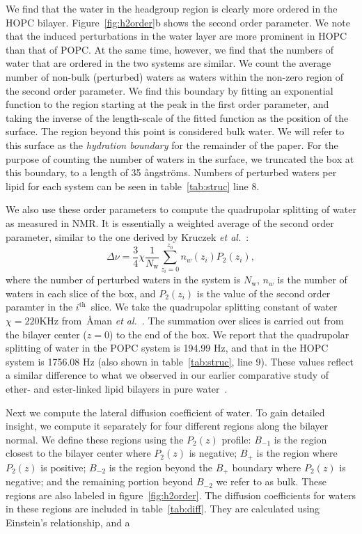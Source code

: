 \documentclass[12pt,preprint,times,openany,draft]{book}
\newcommand{\etal}{\textit{et al.}}
\newcommand{\aangstroms}{{\aa}ngstr{\"o}ms}
\begin{document}
We find that the water in the headgroup region is clearly more ordered in the HOPC bilayer.  
Figure~\ref{fig:h2order}b shows the second order parameter. We note that the induced perturbations in the water layer are more prominent in HOPC than that of POPC.
At the same time, however, we find that the numbers of water that are ordered in the two systems are similar.
We count the average number of non-bulk (perturbed) waters as waters within the non-zero region of the second order parameter. 
We find this boundary by fitting an exponential function to the region starting at the peak in
the first order parameter, and taking the inverse of the length-scale of the fitted function as the position of the surface.
The region beyond this point is considered bulk water. We will refer to this surface as the \emph{hydration boundary} for the remainder of the paper.
For the purpose of counting the number of waters in the surface, we truncated the box at this boundary, to a length of 35 \aangstroms. 
Numbers of perturbed waters per lipid for each system can be seen in table~\ref{tab:struc} line 8.

We also use these order parameters to compute the quadrupolar splitting of water as measured in NMR. 
It is essentially a weighted average of the second order parameter, similar to the one derived by Kruczek \etal~\cite{kruczek:2017:ether}: %
\begin{equation}
\label{eq:deltanu}
\Delta \nu = \frac{3}{4} \chi \frac{1}{N_{\text{w}}}\sum^{z_0}_{z_i=0}n_{w}(z_i)P_2(z_i),
\end{equation}
where the number of perturbed waters in the system is $N_\text{w}$, $n_{w}$ is the number of waters in each slice of the box,
and $P_2(z_i)$ is the value of the second order paramter in the $i^{\text{th}}$~slice. We take the quadrupolar splitting constant of water $\chi=220 \text{KHz}$ 
from~{\AA}man \etal~\cite{aaman:2003}. 
The summation over slices is carried out from the bilayer center ($z=0$) to 
the end of the box. 
We report that the quadrupolar splitting of water in the POPC system is 194.99 Hz, and that in the HOPC system is 1756.08 Hz (also shown in table~\ref{tab:struc}, line 9). 
These values reflect a similar difference to what we observed in our earlier comparative study of ether- and ester-linked lipid bilayers in pure water~\cite{kruczek:2017:ether}.

Next we compute the lateral diffusion coefficient of water. To gain detailed insight, we compute it 
separately for four different regions along the bilayer normal. We define these regions 
using the $P_2(z)$ profile: $B_{-1}$ is the region closest to the bilayer center where 
$P_2(z)$ is negative; $B_{+}$ is the region where $P_2(z)$ 
is positive; $B_{-2}$ is the region beyond the $B_{+}$ boundary where $P_2(z)$ is 
negative; and the remaining portion beyond $B_{-2}$ we refer to as bulk. 
These regions are also labeled in figure~\ref{fig:h2order}. The diffusion coefficients for waters 
in these regions are included in table~\ref{tab:diff}. They are calculated using Einstein's relationship, and a 
\end{document}
